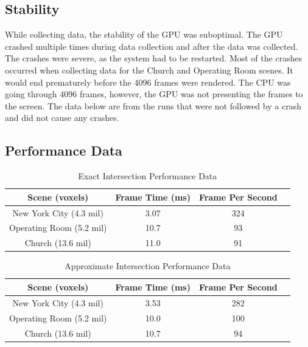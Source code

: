 \documentclass[12pt]{article}
\begin{document}
\subsection{Stability}

While collecting data, the stability of the GPU was suboptimal. The GPU crashed multiple times
during data collection and after the data was collected.
The crashes were severe, as the system had to be restarted. Most of the crashes occurred
when collecting data for the Church and Operating Room scenes. It would end prematurely before the 4096 frames were rendered.
The CPU was going through 4096 frames, however, the GPU was not presenting the frames to the screen.
The data below are from the runs that were not followed by a crash and did not cause any crashes.


\subsection{Performance Data}

\begin{table}[H]
    \centering
    \caption{Exact Intersection Performance Data}
    \vspace{0.5cm}
    \label{tab:Exact-Performance-Data}
    \begin{tabular}{c||c|c|c|}
        Scene (voxels)           & Frame Time (ms) & Frame Per Second \\ \toprule
        New York City (4.3 mil)  & 3.07            & 324              \\
        Operating Room (5.2 mil) & 10.7            & 93               \\
        Church (13.6 mil)        & 11.0            & 91               \\
    \end{tabular}
\end{table}

\begin{table}[H]
    \centering
    \caption{Approximate Intersection Performance Data}
    \vspace{0.5cm}
    \label{tab:Approx-Performance-Data}
    \begin{tabular}{c||c|c|c|}
        Scene (voxels)           & Frame Time (ms) & Frame Per Second \\ \toprule
        New York City (4.3 mil)  & 3.53            & 282              \\
        Operating Room (5.2 mil) & 10.0            & 100              \\
        Church (13.6 mil)        & 10.7            & 94               \\
    \end{tabular}
\end{table}
\end{document}
